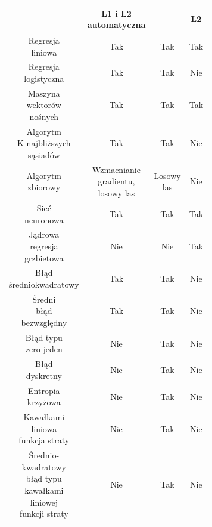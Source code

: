 \begin{longtable}{c | c | c | c}
	\hline
	\makecell{Regularyzacja} & \makecell{L1 i L2 \\ automatyczna} & \makecell{L1 i L2} & L2 \\
	\hline
	\makecell{Regresja \\ liniowa} & Tak & Tak & Tak \\
	\hline
	\makecell{Regresja \\ logistyczna} & Tak & Tak & Nie \\
	\hline
	\makecell{Maszyna \\ wektorów \\ nośnych} & Tak & Tak & Tak \\
	\hline
	\makecell{Algorytm \\ K-najbliższych \\ sąsiadów} & Tak & Tak & Nie \\
	\hline
	\makecell{Algorytm \\ zbiorowy} & \makecell{Wzmacnianie \\ gradientu, \\ losowy las} & \makecell{Losowy \\ las} & Nie \\
	\hline
	\makecell{Sieć \\ neuronowa} & Tak & Tak & Tak \\
	\hline
	\makecell{Jądrowa \\ regresja \\ grzbietowa} & Nie & Nie & Tak \\
	\hline
	\makecell{Błąd \\ średniokwadratowy} & Tak & Tak & Nie \\
	\hline
	\makecell{Średni \\ błąd \\ bezwzględny} & Tak & Tak & Nie \\
	\hline
	\makecell{Błąd typu \\ zero-jeden} & Nie & Tak & Nie \\
	\hline
	\makecell{Błąd \\ dyskretny} & Nie & Tak & Nie \\
	\hline
	\makecell{Entropia \\ krzyżowa} & Nie & Tak & Nie \\
	\hline
	\makecell{Kawałkami \\ liniowa \\ funkcja straty} & Nie & Tak & Nie \\
	\hline
	\makecell{Średnio-\\kwadratowy \\ błąd typu \\ kawałkami \\ liniowej \\ funkcji straty} & Nie & Tak & Nie\\

\end{longtable}
